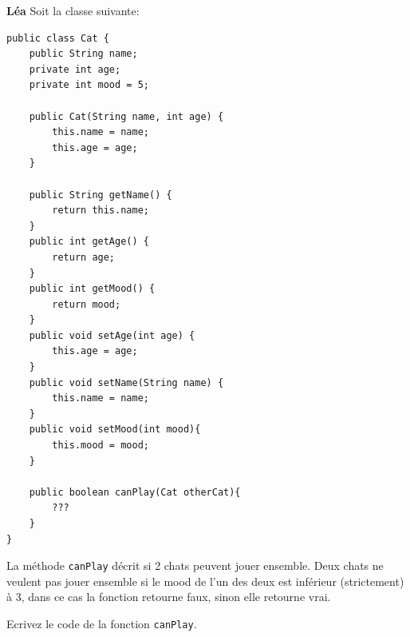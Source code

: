 \begin{Exercice}[5 minutes]\textbf{Léa}
Soit la classe suivante:

\begin{lstlisting}[style=javastyle]
public class Cat {
    public String name;
    private int age;
    private int mood = 5;

    public Cat(String name, int age) {
        this.name = name;
        this.age = age;
    }

    public String getName() {
        return this.name;
    }
    public int getAge() {
        return age;
    }
    public int getMood() {
        return mood;
    }
    public void setAge(int age) {
        this.age = age;
    }
    public void setName(String name) {
        this.name = name;
    }
    public void setMood(int mood){
        this.mood = mood;
    }

    public boolean canPlay(Cat otherCat){
        ???
    }
}
\end{lstlisting}

La méthode \texttt{canPlay} décrit si 2 chats peuvent jouer ensemble. Deux chats ne veulent pas jouer ensemble si le mood de l'un des deux est inférieur (strictement) à 3, dans ce cas la fonction retourne faux, sinon elle retourne vrai.\newline 

Ecrivez le code de la fonction \texttt{canPlay}.

\begin{solution}

\end{solution}
\end{Exercice}

